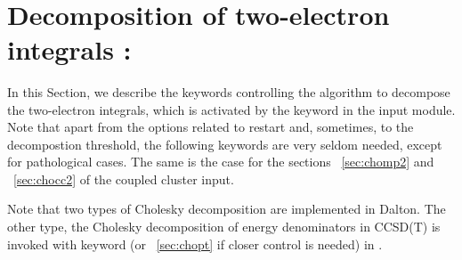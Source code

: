 ~%
\section{Decomposition of two-electron integrals : }\label{sec:choles}
%
%
%

In this Section, we describe the keywords controlling the algorithm to 
decompose the two-electron integrals, which is activated by the 
keyword  in the  input module.
Note that apart from
the options related to restart and, sometimes, to the decompostion
threshold, the following keywords are very seldom needed,
except for pathological cases. The same is the case for the sections
~\ref{sec:chomp2} and ~\ref{sec:chocc2} 
of the coupled cluster input.

Note that two types of Cholesky decomposition are implemented in Dalton.
The other type, the Cholesky decomposition of energy denominators in CCSD(T)  is
invoked with keyword  (or ~\ref{sec:chopt} if 
closer control is needed) in .


\begin{center}
\end{center}

